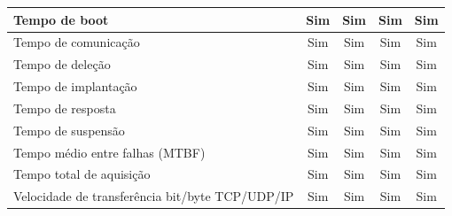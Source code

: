 \documentclass[conference]{IEEEtran}
\begin{document}
\begin{table}[]
\begin{tabular}{|l|c|c|c|c|}
Tempo de boot                                                  & Sim                         & Sim                                                & Sim                                                & Sim                                              \\ \hline
Tempo de comunicação                                           & Sim                         & Sim                                                & Sim                                                & Sim                                              \\ \hline
Tempo de deleção                                               & Sim                         & Sim                                                & Sim                                                & Sim                                              \\ \hline
Tempo de implantação                                           & Sim                         & Sim                                                & Sim                                                & Sim                                              \\ \hline
Tempo de resposta                                              & Sim                         & Sim                                                & Sim                                                & Sim                                              \\ \hline
Tempo de suspensão                                             & Sim                         & Sim                                                & Sim                                                & Sim                                              \\ \hline
Tempo médio entre falhas (MTBF)                                & Sim                         & Sim                                                & Sim                                                & Sim                                              \\ \hline
Tempo total de aquisição                                       & Sim                         & Sim                                                & Sim                                                & Sim                                              \\ \hline
Velocidade de transferência bit/byte TCP/UDP/IP                & Sim                         & Sim                                                & Sim                                                & Sim                                              \\ \hline

\end{tabular}
\end{table}
\end{document}
